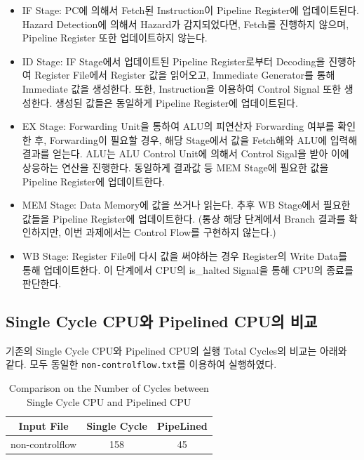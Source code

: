 \documentclass[openright, a4paper]{article}
\newcommand{\code}[1]{\texttt{#1}}
\begin{document}
\begin{itemize}
    \item IF Stage: PC에 의해서 Fetch된 Instruction이 Pipeline Register에 업데이트된다. Hazard Detection에 의해서 Hazard가 감지되었다면, Fetch를 진행하지 않으며, Pipeline Register 또한 업데이트하지 않는다.
    
    \item ID Stage: IF Stage에서 업데이트된 Pipeline Register로부터 Decoding을 진행하여 Register File에서 Register 값을 읽어오고, Immediate Generator를 통해 Immediate 값을 생성한다. 또한, Instruction을 이용하여 Control Signal 또한 생성한다. 생성된 값들은 동일하게 Pipeline Register에 업데이트된다.
    
    \item EX Stage: Forwarding Unit을 통하여 ALU의 피연산자 Forwarding 여부를 확인한 후, Forwarding이 필요할 경우, 해당 Stage에서 값을 Fetch해와 ALU에 입력해 결과를 얻는다. ALU는 ALU Control Unit에 의해서 Control Sigal을 받아 이에 상응하는 연산을 진행한다. 동일하게 결과값 등 MEM Stage에 필요한 값을 Pipeline Register에 업데이트한다.

    \item MEM Stage: Data Memory에 값을 쓰거나 읽는다. 추후 WB Stage에서 필요한 값들을 Pipeline Register에 업데이트한다. (통상 해당 단계에서 Branch 결과를 확인하지만, 이번 과제에서는 Control Flow를 구현하지 않는다.)

    \item WB Stage: Register File에 다시 값을 써야하는 경우 Register의 Write Data를 통해 업데이트한다. 이 단계에서 CPU의 is_halted Signal을 통해 CPU의 종료를 판단한다.
\end{itemize}

\subsection{Single Cycle CPU와 Pipelined CPU의 비교}

기존의 Single Cycle CPU와 Pipelined CPU의 실행 Total Cycles의 비교는 아래와 같다. 모두 동일한 \code{non-controlflow.txt}를 이용하여 실행하였다.

\begin{table}[!h]
  \centering
  \begin{tabular}{@{}ccc@{}}
    \hline
    Input File & Single Cycle & PipeLined\\
    \hline
    non-controlflow & 158 & 45 \\
    \hline
  \end{tabular}
  \caption{Comparison on the Number of Cycles between Single Cycle CPU and Pipelined CPU}
  \label{tab:comparison}
\end{table}
\end{document}
